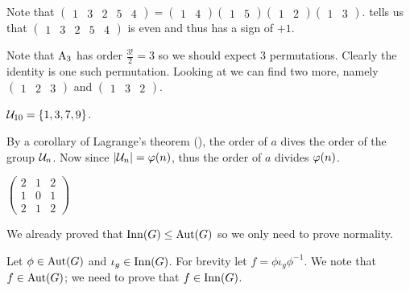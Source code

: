 \begin{questions}
    \item Note that $\begin{pmatrix}1&3&2&5&4\end{pmatrix} = \begin{pmatrix}1&4\end{pmatrix}\begin{pmatrix}1&5\end{pmatrix}\begin{pmatrix}1&2\end{pmatrix}\begin{pmatrix}1&3\end{pmatrix}$.  tells us that $\begin{pmatrix}1&3&2&5&4\end{pmatrix}$ is even and thus has a sign of $+1$.

    \item Note that $\mathrm{A}_{3}$ has order $\frac{3!}{2} = 3$ so we should expect 3 permutations. Clearly the identity is one such permutation. Looking at  we can find two more, namely $\begin{pmatrix}1&2&3\end{pmatrix}$ and $\begin{pmatrix}1&3&2\end{pmatrix}$.

    \item $\mathcal{U}_{10} = \{1, 3, 7, 9\}$.

    \item By a corollary of Lagrange's theorem (), the order of $a$ dives the order of the group $\mathcal{U}_{n}$. Now since $|\mathcal{U}_{n}| = \varphi(n)$, thus the order of $a$ divides $\varphi(n)$.

    \item $\begin{pmatrix}2&1&2\\1&0&1\\2&1&2\end{pmatrix}$

    \item We already proved that $\mathrm{Inn}(G) \leq \mathrm{Aut}(G)$ so we only need to prove normality.

    Let $\phi \in \mathrm{Aut}(G)$ and $\iota_g \in \mathrm{Inn}(G)$. For brevity let $f = \phi\iota_g\phi^{-1}$. We note that $f \in \mathrm{Aut}(G)$; we need to prove that $f \in \mathrm{Inn}(G)$.


\end{questions}
